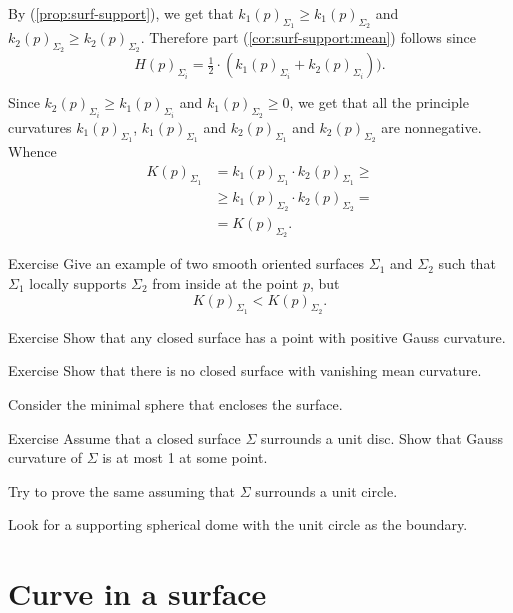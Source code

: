 By (\ref{prop:surf-support}), we get that $k_1(p)_{\Sigma_1}\ge k_1(p)_{\Sigma_2}$ and $k_2(p)_{\Sigma_2}\ge k_2(p)_{\Sigma_2}$.
Therefore part (\ref{cor:surf-support:mean}) follows since 
\[H(p)_{\Sigma_i}=\tfrac12\cdot(k_1(p)_{\Sigma_i}+k_2(p)_{\Sigma_i})).\]


 Since $k_2(p)_{\Sigma_i}\ge k_1(p)_{\Sigma_i}$ and $k_1(p)_{\Sigma_2}\ge 0$, we get that all the principle curvatures 
$k_1(p)_{\Sigma_1}$, $k_1(p)_{\Sigma_1}$ and $k_2(p)_{\Sigma_1}$ and $k_2(p)_{\Sigma_2}$ are nonnegative.
Whence
\begin{align*}
K(p)_{\Sigma_1}&=k_1(p)_{\Sigma_1}\cdot k_2(p)_{\Sigma_1}\ge 
\\
&\ge k_1(p)_{\Sigma_2}\cdot k_2(p)_{\Sigma_2}=
\\
&=K(p)_{\Sigma_2}.
\end{align*}
\qedsf

\begin{thm}{Exercise}
Give an example of two smooth oriented surfaces $\Sigma_1$ and $\Sigma_2$ such that 
$\Sigma_1$ locally supports $\Sigma_2$ from inside at the point $p$, but
\[K(p)_{\Sigma_1}<K(p)_{\Sigma_2}.\]

\end{thm}



\begin{thm}{Exercise}\label{ex:positive-gauss}
Show that any closed surface has a point with positive Gauss curvature.
\end{thm}

\begin{thm}{Exercise}
Show that there is no closed surface with vanishing mean curvature.
\end{thm}

Consider the minimal sphere that encloses the surface.

\begin{thm}{Exercise}\label{ex:surrounds-disc}
Assume that a closed surface $\Sigma$ surrounds a unit disc.
Show that Gauss curvature of $\Sigma$ is at most 1 at some point. 

Try to prove the same assuming that $\Sigma$ surrounds a unit circle.
\end{thm}

Look for a supporting spherical dome with the unit circle as the boundary.

\section*{Curve in a surface}


